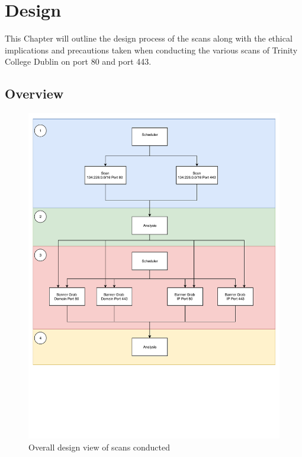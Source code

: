 \documentclass[a4wide,leqno,12pt]{report}
\begin{document}
\chapter{Design}
This Chapter will outline the design process of the scans  along with the ethical implications and precautions taken when conducting the various scans of Trinity College Dublin on port 80 and port 443.
\section{Overview}
\begin{figure}[H]
\centering
\includegraphics[scale=.5,trim={0 6cm 0 0},clip]{pdf_images/design}
\caption{Overall design view of scans conducted}
\label{fig:design}
\end{figure}
\end{document}
